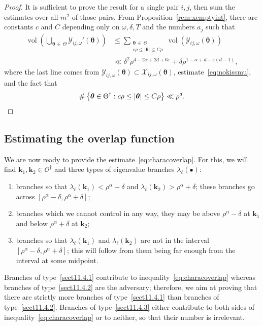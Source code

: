 \documentclass[AHL,Unicode,longabstracts,published]{cedram}
\DeclareMathOperator{\vol}{vol}
\newcommand{\CO}{\mathcal{O}}
\newcommand{\CX}{\mathcal{X}}
\newcommand{\CY}{\mathcal{Y}}
\newcommand{\btheta}{\boldsymbol \theta}
\newcommand{\bk}{\mathbf k}
\newcommand{\eps}{\varepsilon}
\newcommand{\abs}[1]{\left\lvert #1 \right\rvert}
\newcommand{\set}[1]{\left\{ #1 \right\}}
\begin{document}
\begin{proof}
It is sufficient to prove the result for a single pair $i,j$, then sum the estimates over all $m^2$ of those pairs. From Proposition~\ref{rem:xemptyint}, there are constants $c$ and $C$ depending only on $\omega,\delta,T$ and the numbers $a_j$ such that
\begin{equation}
\begin{aligned}
\vol\left(\bigcup_{\btheta\,\in\,\Theta}\CY_{ij,\omega}'(\btheta)\right) &\le \sum_{\substack{\btheta\,\in\,\Theta \\ c \rho \le \abs\btheta
\le C\rho } }\vol\left(\CY_{ij,\omega}(\btheta) \right)\\
&\ll\delta^2 \rho^{4 - 2\alpha + 2 d + 6 \eps} + \delta \rho^{1-
\alpha + d - \eps(d-1)},
\end{aligned}
\end{equation}
where the last line comes from $\CY_{ij,\omega}(\btheta) \subset
\CX_{ij,\omega}(\btheta)$, estimate~\eqref{eq:nokissmu}, and the fact that
\begin{equation}
\#\set{\btheta \in \Theta^\dagger : c \rho \le \abs \btheta \le C \rho} \ll
\rho^d.\qedhere
\end{equation}
\end{proof}


\subsection{Estimating the overlap function}
We are now ready to provide the estimate~\eqref{eq:characoverlap}. For this, we will find $\bk_1, \bk_2 \in \CO^\dagger$ and three types of eigenvalue branches $\lambda_\ell(\bullet)$:
\begin{enumerate}
\item\label{sect11.4.1} branches so that $\lambda_\ell(\bk_1) < \rho^\alpha - \delta$ and $\lambda_\ell(\bk_2) > \rho^\alpha + \delta$; these branches go across $[\rho^\alpha - \delta, \rho^\alpha + \delta]$;
\item\label{sect11.4.2} branches which we cannot control in any way, they may be above $\rho^\alpha - \delta$ at $\bk_1$ and below $\rho^\alpha + \delta$ at $\bk_2$;
\item\label{sect11.4.3} branches so that $\lambda_\ell(\bk_1)$ and $\lambda_\ell(\bk_2)$ are not in the interval $[\rho^\alpha - \delta,\rho^\alpha + \delta]$; this will follow from them being far enough from the interval at some midpoint.
\end{enumerate}
Branches of type~\eqref{sect11.4.1} contribute to inequality~\eqref{eq:characoverlap} whereas branches of type~\eqref{sect11.4.2} are the adversary; therefore, we aim at proving that there are strictly more branches of type~\eqref{sect11.4.1} than branches of type~\eqref{sect11.4.2}. Branches of type~\eqref{sect11.4.3} either contribute to both sides of inequality~\eqref{eq:characoverlap} or to neither, so that their number is irrelevant.
\end{document}
